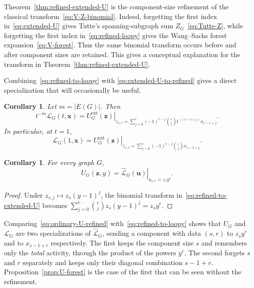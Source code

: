 \documentclass[11pt]{article}
\theoremstyle{plain}
\newtheorem{corollary}[theorem]{Corollary}
\theoremstyle{definition}
\renewcommand{\mathcal}{\mathscr}
\newcommand{\ds}{\displaystyle}
\newcommand{\LL}{\mathcal{L}}    %
\newcommand{\bu}{\mathbf{u}}
\newcommand{\bx}{\mathbf{x}}
\newcommand{\bz}{\mathbf{z}}
\newcommand{\ext}{\mathrm{ext}}
\numberwithin{equation}{section}
\begin{document}
Theorem~\ref{thm:refined-extended-U} is the component-size refinement of the
classical transform~\eqref{eq:V-Z-binomial}.  Indeed, forgetting the first
index in~\eqref{eq:extended-U} gives Tutte's spanning-subgraph sum $Z_G$~\eqref{eq:Tutte-Z}, while forgetting the first index in~\eqref{eq:refined-loopy} gives the
Wang--Sachs forest expansion~\eqref{eq:V-forest}.  Thus the same binomial
transform occurs before and after component sizes are retained.
This gives a conceptual explanation for the transform in Theorem~\ref{thm:refined-extended-U}.

Combining~\eqref{eq:refined-to-loopy} with
\eqref{eq:extended-U-to-refined} gives a direct specialization that will occasionally be useful.

\begin{corollary}\label{cor:extended-U-to-L}
Let $m=|E(G)|$.  Then
\begin{equation}\label{eq:extended-U-to-L}
   t^{-m}\LL_G(t,\bx)
   =
   \left.
      U_G^{\ext}(\bz)
   \right|_{
      z_{s,r}=
      \sum_{j=0}^r
      (-1)^{r-j}\binom{r}{j}
      t^{-(s-1+j)}x_{s-1+j}
   }.
\end{equation}
In particular, at $t=1$,
\begin{equation}\label{eq:extended-U-to-L-t1}
   \LL_G(1,\bx)
   =
   \left.
      U_G^{\ext}(\bz)
   \right|_{
      z_{s,r}=
      \sum_{j=0}^r
      (-1)^{r-j}\binom{r}{j}
      x_{s-1+j}
   }.
\end{equation}
\end{corollary}

\begin{corollary}\label{cor:ordinary-U-refined}
For every graph $G$,
\begin{equation}\label{eq:ordinary-U-refined}
   U_G(\bz,y)
   =
   \left.
      \widehat{\LL}_G(\bu)
   \right|_{u_{s,r}=z_s y^r}.
\end{equation}
\end{corollary}

\begin{proof}
Under $z_{s,j}\mapsto z_s(y-1)^j$, the binomial transform
in~\eqref{eq:refined-to-extended-U} becomes
$\ds \sum_{j=0}^r\binom{r}{j}z_s(y-1)^j=z_sy^r$.
\end{proof}

Comparing~\eqref{eq:ordinary-U-refined} with~\eqref{eq:refined-to-loopy} shows
that $U_G$ and $\LL_G$ are two specializations of $\widehat{\LL}_G$, sending a component with data $(s,r)$ to $z_sy^{r}$ and to $x_{s-1+r}$ respectively.
The first keeps the component size $s$ and remembers only the \emph{total} activity, through the product of the powers $y^{r}$. The second forgets $s$
and $r$ separately and keeps only their diagonal combination $s-1+r$.
Proposition~\ref{prop:U-forest} is the case of the first that can be seen without the refinement.
\end{document}
